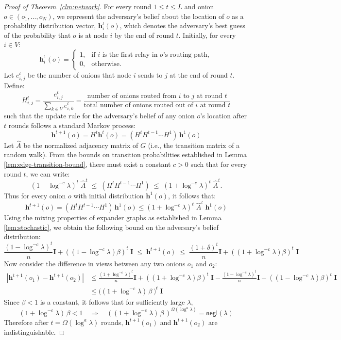 \begin{proof} [Proof of Theorem~\ref{clm:network}]
For every round $1 \leq t \leq L$ and onion $o \in (o_1,\dots,o_N)$, we represent the adversary’s belief about the location of $o$ as a probability distribution vector, $\mathbf{h}^t_i(o)$, which denotes the adversary's best guess of the probability that $o$ is at node $i$ by the end of round $t$. Initially, for every $i \in V$:
$$
\mathbf{h}^1_i(o) =
\begin{cases}
    1, & \text{if $i$ is the first relay in $o$'s routing path},\\
    0, & \text{otherwise.}
\end{cases}
$$
Let $e^t_{i,j}$ be the number of onions that node $i$ sends to $j$ at the end of round $t$. Define:
$$
H^t_{i,j} = \frac{e^t_{i,j}}{\sum_{k \in V} e^t_{i,k}} = \frac{\text{number of onions routed from $i$ to $j$ at round $t$}}{\text{total number of onions routed out of $i$ at round $t$}}
$$
such that the update rule for the adversary's belief of any onion $o$'s location after $t$ rounds follows a standard Markov process:
$$
\mathbf{h}^{t+1}(o) = H^t \mathbf{h}^{t}(o) = (H^t H^{t-1} \cdots H^1) \,\mathbf{h}^1(o)
$$
Let $\hat{A}$ be the normalized adjacency matrix of $G$ (i.e., the transition matrix of a random walk). From the bounds on transition probabilities established in Lemma \ref{lem:edge-transition-bound}, there must exist a constant $c > 0$ such that for every round $t$, we can write:
$$
(1 - \log^{-c} \lambda)^t \; \hat{A}^t \; \leq \; (H^t H^{t-1} \cdots H^1) \; \leq \; (1 + \log^{-c} \lambda)^t \; \hat{A}^t.
$$
Thus for every onion $o$ with initial distribution $\mathbf{h}^1(o)$, it follows that:
$$
\mathbf{h}^{t+1}(o) = (H^t H^{t-1} \cdots H^1) \,\mathbf{h}^1(o) \leq (1 + \log^{-c} \lambda)^t \; \hat{A}^t \; \mathbf{h}^1(o)
$$
Using the mixing properties of expander graphs as established in Lemma \ref{lem:stochastic}, we obtain the following bound on the adversary’s belief distribution:
$$
\frac{(1 - \log^{-c} \lambda)^t}{n} \mathbf{I} + ((1 - \log^{-c} \lambda)  \beta)^t \; \mathbf{I} \; \leq \;  \mathbf{h}^{t+1}(o)\;  \leq \; \frac{(1 + \delta)^t}{n} \mathbf{I} + ((1 + \log^{-c} \lambda)  \beta)^t \; \mathbf{I} 
$$
Now consider the difference in views between any two onions $o_1$ and $o_2$:
\begin{align*}
    |\mathbf{h}^{t+1}(o_1) - \mathbf{h}^{t+1}(o_2)| &\leq \frac{(1 + \log^{-c} \lambda)^t}{n} \mathbf{I} + ((1 + \log^{-c} \lambda)  \beta)^t \; \mathbf{I} - \frac{(1 - \log^{-c} \lambda)^t}{n} \mathbf{I} - ((1 - \log^{-c} \lambda)  \beta)^t \; \mathbf{I}\\
    &\leq \Big((1 + \log^{-c} \lambda) \, \beta \,\Big)^t \; \mathbf{I}
\end{align*}
Since $\beta < 1$ is a constant, it follows that for sufficiently large $\lambda$, 
$$
(1 + \log^{-c} \lambda) \, \beta < 1 \quad \Rightarrow \quad ((1 + \log^{-c} \lambda) \, \beta \,)^{\Omega(\log^a \lambda)} = \mathsf{negl}(\lambda)
$$
Therefore after $t = \Omega(\log^a \lambda)$ rounds, $\mathbf{h}^{t+1}(o_1)$ and $\mathbf{h}^{t+1}(o_2)$ are indistinguishable. 

\end{proof}


